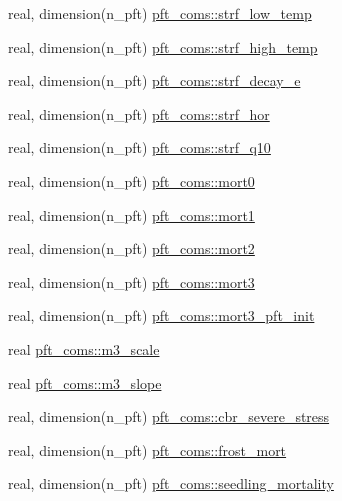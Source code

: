 \begin{DoxyCompactItemize}
\item 
real, dimension(n\+\_\+pft) \hyperlink{namespacepft__coms_a1e68af5e117a86b34f515771b0aa4b37}{pft\+\_\+coms\+::strf\+\_\+low\+\_\+temp}
\item 
real, dimension(n\+\_\+pft) \hyperlink{namespacepft__coms_a065e5f350ad9ac77d9a66c7486268fb8}{pft\+\_\+coms\+::strf\+\_\+high\+\_\+temp}
\item 
real, dimension(n\+\_\+pft) \hyperlink{namespacepft__coms_a5cfdb0129f160897b6cc37536a67cfc5}{pft\+\_\+coms\+::strf\+\_\+decay\+\_\+e}
\item 
real, dimension(n\+\_\+pft) \hyperlink{namespacepft__coms_a7ef86f21ed213453006c76ac60401a75}{pft\+\_\+coms\+::strf\+\_\+hor}
\item 
real, dimension(n\+\_\+pft) \hyperlink{namespacepft__coms_ab74ac70bc631850f0b352ce40c565acb}{pft\+\_\+coms\+::strf\+\_\+q10}
\item 
real, dimension(n\+\_\+pft) \hyperlink{namespacepft__coms_a70607e766522bb0ddd5329aa60d6b5e7}{pft\+\_\+coms\+::mort0}
\item 
real, dimension(n\+\_\+pft) \hyperlink{namespacepft__coms_a8a99e260a7d72b81ec6887289e4e8172}{pft\+\_\+coms\+::mort1}
\item 
real, dimension(n\+\_\+pft) \hyperlink{namespacepft__coms_a869ad0792b73ae5285eeab0a57534f34}{pft\+\_\+coms\+::mort2}
\item 
real, dimension(n\+\_\+pft) \hyperlink{namespacepft__coms_a20a7ffd42484a2150383fd540cd97641}{pft\+\_\+coms\+::mort3}
\item 
real, dimension(n\+\_\+pft) \hyperlink{namespacepft__coms_a1a1f98514e1c80f9ab10a76eacb4f7eb}{pft\+\_\+coms\+::mort3\+\_\+pft\+\_\+init}
\item 
real \hyperlink{namespacepft__coms_ad41cac7d6fa0b8d962cf3acd1d4b1587}{pft\+\_\+coms\+::m3\+\_\+scale}
\item 
real \hyperlink{namespacepft__coms_a27553d075979c77be9aceaf78a289109}{pft\+\_\+coms\+::m3\+\_\+slope}
\item 
real, dimension(n\+\_\+pft) \hyperlink{namespacepft__coms_aefc2c80125aa55f81fae3724cb4d5339}{pft\+\_\+coms\+::cbr\+\_\+severe\+\_\+stress}
\item 
real, dimension(n\+\_\+pft) \hyperlink{namespacepft__coms_a744036814ca3b450807de9613e918153}{pft\+\_\+coms\+::frost\+\_\+mort}
\item 
real, dimension(n\+\_\+pft) \hyperlink{namespacepft__coms_a0fe258b3674104f09d7226f87f39fc0b}{pft\+\_\+coms\+::seedling\+\_\+mortality}
\item 

\end{DoxyCompactItemize}
